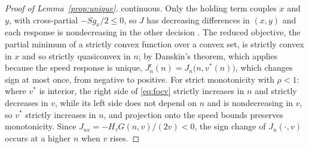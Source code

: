\documentclass[11pt]{article}
\numberwithin{proposition}{section}
\theoremstyle{definition}
\theoremstyle{remark}
\theoremstyle{plain}
\begin{document}
\begin{proof}[Proof of Lemma~\ref{prop:unique}]
continuous. Only the holding term couples $x$ and $y$, with cross-partial $-Sg_x/2\le0$, so $J$ has decreasing
differences in $(x,y)$ and each response is nondecreasing in the other decision \citep{topkis1998}. The reduced objective, the partial
minimum of a strictly convex function over a convex set, is strictly convex in $x$ and so strictly quasiconvex in
$n$; by Danskin's theorem, which applies because the speed response is unique,
$J^{\mathrm r}_n(n)=J_n\big(n,v^*(n)\big)$, which changes sign at most once, from negative to positive. For strict
monotonicity with $\rho<1$: where $v^*$ is interior, the right side of \eqref{eq:focv} strictly increases in $n$
and strictly decreases in $v$, while its left side does not depend on $n$ and is nondecreasing in $v$, so $v^*$
strictly increases in $n$, and projection onto the speed bounds preserves monotonicity. Since
$J_{nv}=-H_\tau G(n,v)/(2v)<0$, the sign change of $J_n(\cdot,v)$ occurs at a higher $n$ when $v$ rises.
\end{proof}
\end{document}
